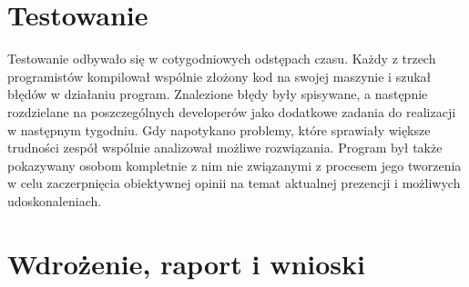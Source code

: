 \section{Testowanie}
Testowanie odbywało się w cotygodniowych odstępach czasu. Każdy z trzech programistów kompilował wspólnie złożony kod na swojej maszynie i szukał błędów w działaniu program. Znalezione błędy były spisywane, a następnie rozdzielane na poszczególnych developerów jako dodatkowe zadania do realizacji w następnym tygodniu. Gdy napotykano problemy, które sprawiały większe trudności zespół wspólnie analizował możliwe rozwiązania. Program był także pokazywany osobom kompletnie z nim nie związanymi z procesem jego tworzenia w celu zaczerpnięcia obiektywnej opinii  na temat aktualnej prezencji i możliwych udoskonaleniach.
\section{Wdrożenie, raport i wnioski}
